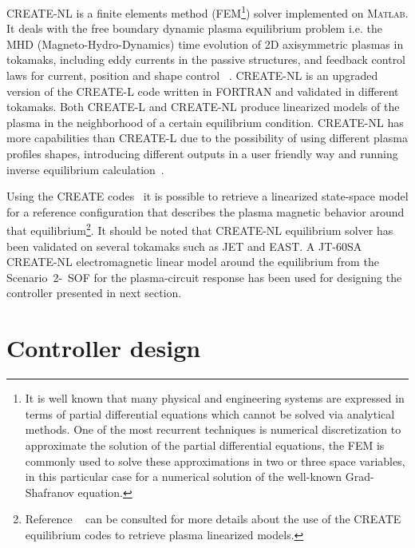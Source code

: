 CREATE-NL  is a finite elements method (FEM\footnote{It is well known that many physical and engineering systems are expressed in terms of partial differential equations which cannot be solved via analytical methods. One of the most recurrent techniques is numerical discretization to approximate the solution of the partial differential equations, the FEM is commonly used to solve these approximations in two or three space variables, in this particular case for a numerical solution of the well-known Grad-Shafranov equation. }) solver implemented on \textsc{Matlab}. It deals with the free boundary dynamic plasma equilibrium problem i.e. the MHD (Magneto-Hydro-Dynamics) time evolution of 2D axisymmetric plasmas in tokamaks, including eddy currents in the passive structures, and feedback control laws for current, position and shape control ~\cite{Albanese:CREATENLnew}. CREATE-NL is an upgraded version of the CREATE-L code written in FORTRAN and validated in different tokamaks. Both CREATE-L and CREATE-NL produce linearized models of the plasma in the neighborhood of a certain equilibrium condition. CREATE-NL has more capabilities than CREATE-L due to the possibility of using different plasma profiles shapes,  introducing different outputs in a user friendly way and  running inverse equilibrium calculation~\cite{DeTommasi2007}. 
\smallskip

Using the CREATE codes~\cite{Albanese:CREATEL,Albanese:CREATENLnew} it is possible to retrieve a linearized state-space model for a reference configuration that describes the plasma magnetic behavior around that equilibrium\footnote{Reference  ~\cite[Sec.~3]{NCruz} can be consulted for more details about the use of the CREATE equilibrium codes to retrieve plasma linearized models.}. It should be noted that CREATE-NL equilibrium solver has been validated on several tokamaks such as JET and EAST. A JT-60SA CREATE-NL electromagnetic linear model around the equilibrium from the Scenario~2-~SOF  for the plasma-circuit response has been used for  designing  the controller presented in next section. 
\smallskip






\section{Controller design}

